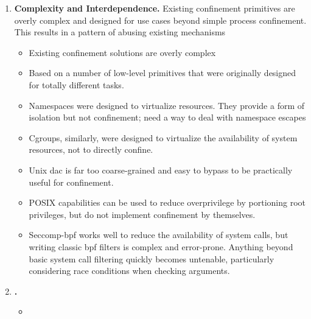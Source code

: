 \begin{enumerate}
  \item \textbf{Complexity and Interdependence.}
    Existing confinement primitives are overly complex and designed for use
    cases beyond simple process confinement. This results in a pattern of
    abusing existing mechanisms
  \begin{inprogress}
    \begin{itemize}
      \item Existing confinement solutions are overly complex
      \item Based on a number of low-level primitives that were originally designed for
            totally different tasks.
      \item Namespaces were designed to virtualize resources. They provide a form of
            isolation but not confinement; need a way to deal with namespace escapes
      \item Cgroups, similarly, were designed to virtualize the availability of system
            resources, not to directly confine.
      \item Unix \gls{dac} is far too coarse-grained and easy to bypass to be practically useful for confinement.
      \item POSIX capabilities can be used to reduce overprivilege by portioning root privileges, but do not
            implement confinement by themselves.
      \item Seccomp-bpf works well to reduce the availability of system calls, but writing
            classic \gls{bpf} filters is complex and error-prone. Anything beyond basic system call
            filtering quickly becomes untenable, particularly considering race conditions when
            checking arguments.
    \end{itemize}
  \end{inprogress}

  \item \textbf{.}
  \begin{inprogress}
    \begin{itemize}
      \item
    \end{itemize}
  \end{inprogress}


\end{enumerate}

